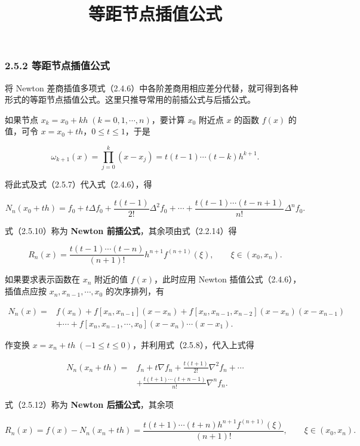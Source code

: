 \documentclass[
  10pt,
  fontset=fandol]{ctexart}
\title{等距节点插值公式}
\author{}
\date{}
\begin{document}
\maketitle

\subsubsection{2.5.2 等距节点插值公式}\label{ux7b49ux8dddux8282ux70b9ux63d2ux503cux516cux5f0f}

将 Newton 差商插值多项式（2.4.6）中各阶差商用相应差分代替，就可得到各种形式的等距节点插值公式。这里只推导常用的前插公式与后插公式。

如果节点 \(x_k=x_0+kh\;(k=0,1,\cdots,n)\)，要计算 \(x_0\) 附近点 \(x\) 的函数 \(f(x)\) 的值，可令 \(x=x_0+th\)，\(0\le t\le1\)，于是

\[
\omega_{k+1}(x)=\prod_{j=0}^{k}(x-x_j)=t(t-1)\cdots(t-k)h^{k+1}.
\]

将此式及式（2.5.7）代入式（2.4.6），得

\[
N_n(x_0+th)=f_0+t\Delta f_0+\frac{t(t-1)}{2!}\Delta^2 f_0+\cdots+\frac{t(t-1)\cdots(t-n+1)}{n!}\Delta^n f_0.
\tag{2.5.10}
\]

式（2.5.10）称为 \textbf{Newton 前插公式}，其余项由式（2.2.14）得

\[
R_n(x)=\frac{t(t-1)\cdots(t-n)}{(n+1)!}h^{n+1}f^{(n+1)}(\xi),\qquad\xi\in(x_0,x_n).
\tag{2.5.11}
\]

如果要求表示函数在 \(x_n\) 附近的值 \(f(x)\)，此时应用 Newton 插值公式（2.4.6），插值点应按 \(x_n,x_{n-1},\cdots,x_0\) 的次序排列，有

\[
\begin{aligned}
N_n(x)={}&f(x_n)+f[x_n,x_{n-1}](x-x_n)+f[x_n,x_{n-1},x_{n-2}](x-x_n)(x-x_{n-1})\\
&+\cdots+f[x_n,x_{n-1},\cdots,x_0](x-x_n)\cdots(x-x_1).
\end{aligned}
\]

作变换 \(x=x_n+th\;(-1\le t\le0)\)，并利用式（2.5.8），代入上式得

\[
\begin{aligned}
N_n(x_n+th)={}&f_n+t\nabla f_n+\frac{t(t+1)}{2!}\nabla^2 f_n+\cdots\\
&+\frac{t(t+1)\cdots(t+n-1)}{n!}\nabla^n f_n.
\end{aligned}
\tag{2.5.12}
\]

式（2.5.12）称为 \textbf{Newton 后插公式}，其余项

\[
R_n(x)=f(x)-N_n(x_n+th)=\frac{t(t+1)\cdots(t+n)h^{n+1}f^{(n+1)}(\xi)}{(n+1)!},\qquad\xi\in(x_0,x_n).
\]
\end{document}
